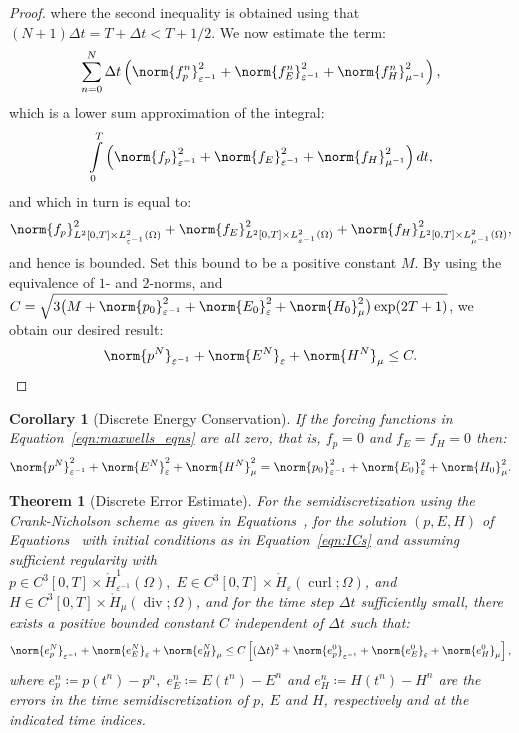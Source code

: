 \documentclass{amsart}
\theoremstyle{thmstyleone}%
\newtheorem{theorem}{Theorem}%
\theoremstyle{thmstyletwo}%
\theoremstyle{thmstylethree}%
\newtheorem{corollary}{Corollary}[theorem]
\DeclareMathOperator{\curl}{curl}
\def\divgn{\operatorname{div}}
\begin{document}
\begin{proof}
where the second inequality is obtained using that $\displaystyle (N + 1) \Delta t = T + \Delta t < T + 1/2$. We now estimate the term:
\[
  \sum \limits_{n = 0}^{N} \Delta t \left( \norm{f_p^n}^2_{\varepsilon^{-1}} + \norm{f_E^n}^2_{\varepsilon^{-1}} + \norm{f_H^n}^2_{\mu^{-1}} \right),
\]
which is a lower sum approximation of the integral:
\[
  \int\limits_0^T \left(\norm{f_p}^2_{\varepsilon^{-1}} + \norm{f_E}^2_{\varepsilon^{-1}} + \norm{f_H}^2_{\mu^{-1}}\right) dt,
\]
and which in turn is equal to:
\[
  \norm{f_p}^2_{L^2[0, T] \times L^2_{\varepsilon^{-1}}(\Omega)} + \norm{f_E}^2_{L^2[0, T] \times L^2_{\varepsilon^{-1}}(\Omega)} + \norm{f_H}^2_{L^2[0, T] \times L^2_{\mu^{-1}}(\Omega)},
\]
and hence is bounded. Set this bound to be a positive constant $M$. By using the equivalence of $1$- and $2$-norms, and $C = \sqrt{ 3 \big( M + \norm{p_0}^2_{\varepsilon^{-1}} + \norm{E_0}^2_{\varepsilon} + \norm{H_0}^2_{\mu} \big) \exp(2 T + 1)}$, we obtain our desired result:
\[
  \norm{p^N}_{\varepsilon^{-1}} + \norm{E^N}_{\varepsilon} + \norm{H^N}_{\mu} \le C. \qedhere
\]
\end{proof}

\begin{corollary}[Discrete Energy Conservation]\label{corr:dscrt_enrgy_cnsrvtn_cn}
If the forcing functions in Equation~\eqref{eqn:maxwells_eqns} are all zero, that is, $f_p = 0$ and $f_E = f_H = 0$ then:
\[
  \norm{p^N}^2_{\varepsilon^{-1}} + \norm{E^N}^2_{\varepsilon} + \norm{H^N}^2_{\mu} = \norm{p_0}^2_{\varepsilon^{-1}} + \norm{E_0}^2_{\varepsilon} + \norm{H_0}^2_{\mu}.
\]
\end{corollary}

\begin{theorem}[Discrete Error Estimate]\label{thm:dscrt_error_estmt_cn}
For the semidiscretization using the Crank-Nicholson scheme as given in Equations~, for the solution $(p, E, H)$ of Equations~ with initial conditions as in Equation~\eqref{eqn:ICs} and assuming sufficient regularity with $p \in C^3[0, T] \times \mathring{H}^1_{\varepsilon^{-1}}(\Omega), \; E \in C^3[0, T] \times \mathring{H}_{\varepsilon}(\curl; \Omega)$, and $H \in C^3[0, T] \times \mathring{H}_{\mu}(\divgn; \Omega)$, and for the time step $\Delta t$ sufficiently small, there exists a positive bounded constant $C$ independent of $\Delta t$ such that:
\begin{equation}
\norm{e_p^N}_{\varepsilon^{-1}} + \norm{e_E^N}_{\varepsilon} + \norm{e_H^N}_{\mu} \le C \left[(\Delta t)^2 + \norm{e_p^0}_{\varepsilon^{-1}} + \norm{e_E^0}_{\varepsilon} + \norm{e_H^0}_{\mu} \right],
\label{eqn:errorestimate_cn}
\end{equation}
where $e_p^n \coloneq p(t^n) - p^n, \; e_E^n \coloneq E(t^n) - E^n$ and $e_H^n \coloneq H(t^n) - H^n$ are the errors in the time semidiscretization of $p$, $E$ and $H$, respectively and at the indicated time indices.
\end{theorem}
\end{document}
